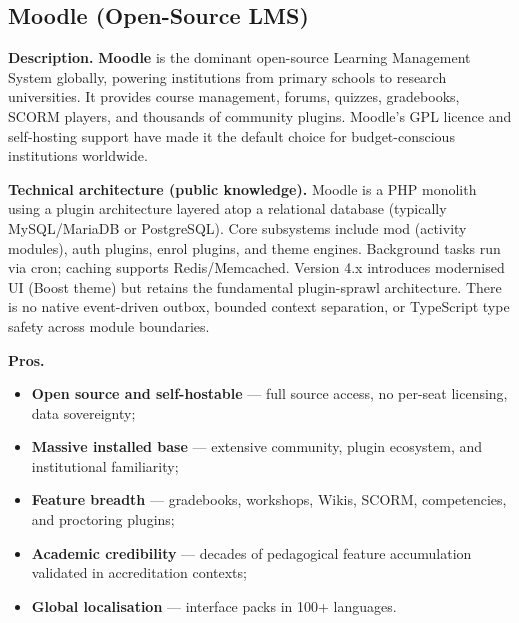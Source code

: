\subsection{Moodle (Open-Source LMS)}
\label{subsec:moodle}

\textbf{Description.}
\textbf{Moodle} is the dominant open-source Learning Management System globally, powering institutions from primary schools to research universities. It provides course management, forums, quizzes, gradebooks, SCORM players, and thousands of community plugins. Moodle's GPL licence and self-hosting support have made it the default choice for budget-conscious institutions worldwide.

\textbf{Technical architecture (public knowledge).}
Moodle is a PHP monolith using a plugin architecture layered atop a relational database (typically MySQL/MariaDB or PostgreSQL). Core subsystems include mod (activity modules), auth plugins, enrol plugins, and theme engines. Background tasks run via cron; caching supports Redis/Memcached. Version 4.x introduces modernised UI (Boost theme) but retains the fundamental plugin-sprawl architecture. There is no native event-driven outbox, bounded context separation, or TypeScript type safety across module boundaries.

\textbf{Pros.}
\begin{itemize}
  \item \textbf{Open source and self-hostable} --- full source access, no per-seat licensing, data sovereignty;
  \item \textbf{Massive installed base} --- extensive community, plugin ecosystem, and institutional familiarity;
  \item \textbf{Feature breadth} --- gradebooks, workshops, Wikis, SCORM, competencies, and proctoring plugins;
  \item \textbf{Academic credibility} --- decades of pedagogical feature accumulation validated in accreditation contexts;
  \item \textbf{Global localisation} --- interface packs in 100+ languages.
\end{itemize}

